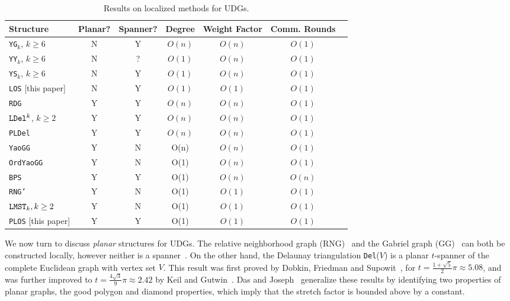 \documentclass{llncs}
\newcommand{\ldel}{{\tt LDel}}
\newcommand{\bps}{{\tt BPS}}
\newcommand{\lmst}{{\tt LMST}}
\newcommand{\pldel}{{\tt PLDel}}
\newcommand{\del}{{\tt Del}}
\begin{document}
\begin{table}[htpb]
\begin{center}
\begin{tabular}{|l|c|c|c|c|c|c|} \hline
Structure & Planar? & Spanner? & Degree & Weight Factor & Comm. Rounds \\ \hline
{\tt YG$_k$}, $k \ge 6$~\cite{Yao82} & N & Y & $O(n)$ & $O(n)$  & $O(1)$ \\ \hline
{\tt YY$_k$}, $k \ge 6$~\cite{li02sparse} & N & ? & $O(1)$ & $O(n)$ & $O(1)$ \\ \hline
{\tt YS$_k$}, $k \ge 6$~\cite{WangLi03} & N & Y & $O(1)$ & $O(n)$ & $O(1)$ \\ \hline
\rowcolor{cyan}
{\tt LOS} [this paper] & N & Y & $O(1)$ & $O(1)$ & $O(1)$ \\ \hline
{\tt RDG}~\cite{GGH+01} & Y & Y & $O(n)$ & $O(n)$  & $O(1)$ \\ \hline
$\ldel^k$, $k \ge 2$~\cite{LCW02} & Y & Y & $O(n)$ & $O(n)$ & $O(1)$ \\ \hline
\pldel~\cite{LCW02,AraujoR04} & Y & Y & $O(n)$ & $O(n)$ & $O(1)$ \\ \hline
{\tt YaoGG}~\cite{li02sparse}& Y & N & O(n) & $O(n)$ & $O(1)$ \\ \hline
{\tt OrdYaoGG}~\cite{SWLF04}& Y & N & O(1) & $O(n)$ & $O(1)$ \\ \hline
\bps~\cite{WangLi03,LiWang04}& Y & Y & O(1) & $O(n)$ & $O(n)$ \\ \hline
{\tt RNG'}~\cite{li-localmst-03}& Y & N & O(1) & $O(1)$ & $O(1)$ \\ \hline
$\lmst_k, k \ge 2$~\cite{lws-ieee-04}& Y & N & O(1) & $O(1)$ & $O(1)$ \\ \hline
\rowcolor{cyan}
{\tt PLOS} [this paper] & Y & Y & O(1) & $O(1)$ & $O(1)$ \\ \hline
\end{tabular}
\end{center}
\caption[]{Results on localized methods for UDGs.}
\label{tab:results}
\end{table}

We now turn to discuss \emph{planar} structures for UDGs.
The relative neighborhood graph (RNG)~\cite{god-pr-80}
and the Gabriel graph (GG)~\cite{gg-geo-69} can both be constructed locally,
however neither is a spanner~\cite{BDEK06}.
On the other hand, the Delaunay triangulation \del($V$) is a planar $t$-spanner
of the complete Euclidean graph with vertex set $V$.
This result was first proved by Dobkin, Friedman and Supowit~\cite{dfs-dg-90},
for $t = \frac{1 + \sqrt{5}}{2}\pi \approx 5.08$, and was further improved
to $t = \frac{4 \sqrt{3}}{9} \pi \approx 2.42$ by Keil and Gutwin~\cite{kg-dt-92}.
Das and Joseph~\cite{dj-tcg-89} generalize these results by identifying
two properties of planar graphs, the good polygon and diamond properties,
which imply that the stretch factor is bounded above by a constant.
\end{document}
